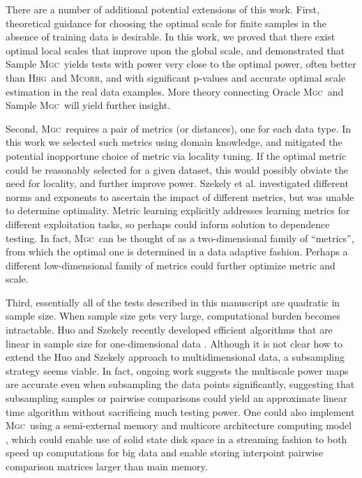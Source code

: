 \documentclass[11pt]{article}
\providecommand{\sct}[1]{{\normalfont\textsc{#1}}}
\newcommand{\Mgc}{\sct{Mgc}}
\newcommand{\Hhg}{\sct{Hhg}}
\newcommand{\Mcorr}{\sct{Mcorr}}
\begin{document}
There are a number of additional potential extensions of this work. First, theoretical guidance for choosing the optimal scale for finite samples in the absence of training data is desirable. 
In this work, we proved that there exist optimal local scales that improve upon the global scale, and demonstrated that Sample \Mgc~yields tests with power very close to the optimal power, often better than \Hhg~and \Mcorr, and with significant p-values and accurate optimal scale estimation in the real data examples. More theory connecting Oracle \Mgc~and  Sample \Mgc~will yield further insight.

Second, \Mgc~requires a pair of metrics (or distances), one for each data type. In this work we selected such metrics using domain knowledge, and mitigated the potential inopportune choice of metric via locality tuning.  If the optimal metric could be reasonably selected for a given dataset, this would possibly obviate the need for locality, and further improve power. Szekely et al. investigated different norms and exponents to ascertain the impact of different metrics, but was unable to determine optimality.
Metric learning \cite{xing2003distance} explicitly addresses learning metrics for different exploitation tasks, so perhaps could inform solution to dependence testing.
In fact, \Mgc~can be thought of as a two-dimensional family of ``metrics'', from which the optimal one is determined in a data adaptive fashion.  Perhaps a different low-dimensional family of metrics could further optimize metric and scale.

Third, essentially all of the tests described in this manuscript are quadratic in sample size.  When sample size gets very large, computational burden becomes intractable. Huo and Szekely  recently developed efficient algorithms that are linear in sample size for one-dimensional data \cite{Huo2016}.  Although it is not clear how to extend the Huo and Szekely approach to multidimensional data, a subsampling strategy seems viable. In fact, ongoing work suggests the multiscale power maps are accurate even when subsampling the data points significantly, suggesting that subsampling samples or pairwise comparisons could yield an approximate linear time algorithm without sacrificing much testing power.  One could also implement \Mgc~using a semi-external memory and multicore architecture computing model \cite{Zheng2016},  which could enable use of solid state disk space in a streaming fashion to both speed up computations for big data and enable storing interpoint pairwise comparison matrices larger than main memory.
\end{document}
